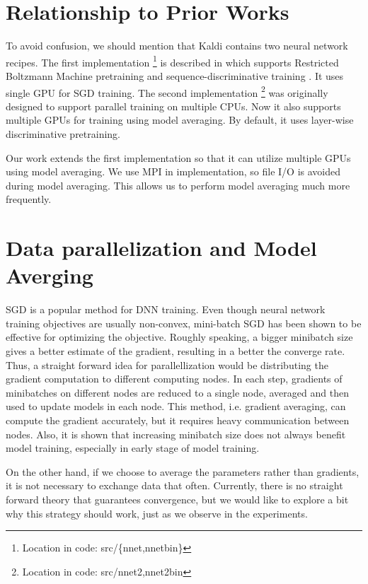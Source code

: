 \documentclass{article}
\begin{document}
\section{Relationship to Prior Works}
To avoid confusion, we should mention that Kaldi\cite{kaldi11} contains two neural network recipes. The first implementation
\footnote{Location in code: src/\{nnet,nnetbin\}} is described in \cite{vesely2013sequence} which supports Restricted Boltzmann Machine 
pretraining \cite{hinton2006fast} and sequence-discriminative training \cite{povey2008boosted}. It uses single GPU 
for SGD training. The second implementation \footnote{Location in code: src/{nnet2,nnet2bin}}
\cite{zhang2014improving} was originally designed to support parallel training on multiple CPUs. Now it also supports 
multiple GPUs for training using model averaging. By default, it uses layer-wise discriminative pretraining.

Our work extends the first implementation so that it can utilize multiple GPUs using model averaging. We use MPI 
in implementation, so file I/O is avoided during model averaging. This allows us to perform model averaging much
more frequently. 

\section{Data parallelization and Model Averging}
SGD is a popular method for DNN training. Even though neural network training objectives are usually non-convex, 
mini-batch SGD has been shown to be effective for optimizing the objective\cite{seide2011conversational}. 
Roughly speaking, a bigger minibatch size gives a better estimate of the gradient, resulting in a better the converge rate. 
Thus, a straight forward idea for parallellization would be distributing the gradient computation to different computing
nodes. In each step, gradients of minibatches on different nodes are reduced to a single node, averaged and then used to 
update models in each node. This method, i.e. gradient averaging, can compute the gradient accurately, but it requires 
heavy communication between nodes.
Also, it is shown that increasing minibatch size does not always benefit model training\cite{seide2011conversational}, 
especially in early stage of model training.

On the other hand, if we choose to average the parameters rather than gradients, it is not necessary to exchange data that often. 
Currently, there is no straight forward theory that guarantees convergence, but we would like to explore a bit why this strategy 
should work, just as we observe in the experiments.
\end{document}
